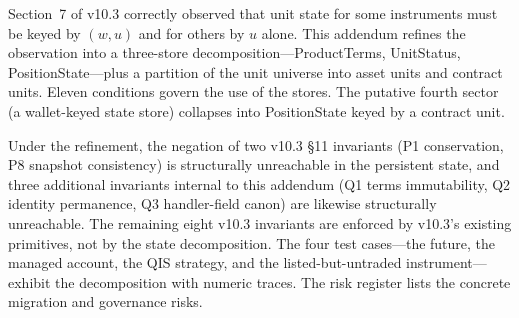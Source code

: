 \documentclass[11pt,a4paper]{article}
\begin{document}
Section~7 of v10.3 correctly observed that unit state for some instruments must be keyed by $(w, u)$ and for others by $u$ alone. This addendum refines the observation into a three-store decomposition---ProductTerms, UnitStatus, PositionState---plus a partition of the unit universe into asset units and contract units. Eleven conditions govern the use of the stores. The putative fourth sector (a wallet-keyed state store) collapses into PositionState keyed by a contract unit.

Under the refinement, the negation of two v10.3 \S 11 invariants (P1 conservation, P8 snapshot consistency) is structurally unreachable in the persistent state, and three additional invariants internal to this addendum (Q1 terms immutability, Q2 identity permanence, Q3 handler-field canon) are likewise structurally unreachable. The remaining eight v10.3 invariants are enforced by v10.3's existing primitives, not by the state decomposition. The four test cases---the future, the managed account, the QIS strategy, and the listed-but-untraded instrument---exhibit the decomposition with numeric traces. The risk register lists the concrete migration and governance risks.
\end{document}
